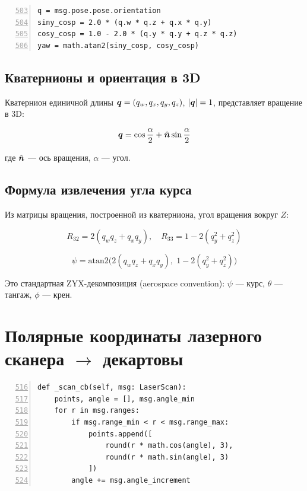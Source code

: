 \begin{filebox}[title={\filepath{dashboard\_node.py}, строки 503--506 --- \_odom\_cb()}]
\begin{lstlisting}[style=pythonstyle, numbers=left, firstnumber=503]
q = msg.pose.pose.orientation
siny_cosp = 2.0 * (q.w * q.z + q.x * q.y)
cosy_cosp = 1.0 - 2.0 * (q.y * q.y + q.z * q.z)
yaw = math.atan2(siny_cosp, cosy_cosp)
\end{lstlisting}
\end{filebox}

\subsection{Кватернионы и ориентация в 3D}

Кватернион единичной длины $\bm{q} = (q_w, q_x, q_y, q_z)$, $|\bm{q}|=1$,
представляет вращение в 3D:

\begin{equation}
  \bm{q} = \cos\frac{\alpha}{2} + \hat{\bm{n}}\sin\frac{\alpha}{2}
  \label{eq:quaternion_def}
\end{equation}

где $\hat{\bm{n}}$ --- ось вращения, $\alpha$ --- угол.

\subsection{Формула извлечения угла курса}

Из матрицы вращения, построенной из кватерниона, угол вращения вокруг $Z$:

\begin{equation}
  R_{32} = 2(q_w q_z + q_x q_y), \quad
  R_{33} = 1 - 2(q_y^2 + q_z^2)
  \label{eq:rot_matrix_elems}
\end{equation}

\begin{equation}
  \boxed{\psi = \mathrm{atan2}\!\bigl(2(q_w q_z + q_x q_y),\;
    1 - 2(q_y^2 + q_z^2)\bigr)}
  \label{eq:yaw_from_quat}
\end{equation}

Это стандартная ZYX-декомпозиция (aerospace convention):
$\psi$ --- курс, $\theta$ --- тангаж, $\phi$ --- крен.

\section{Полярные координаты лазерного сканера $\to$ декартовы}

\begin{filebox}[title={\filepath{dashboard\_node.py}, строки 516--521 --- \_scan\_cb()}]
\begin{lstlisting}[style=pythonstyle, numbers=left, firstnumber=516]
def _scan_cb(self, msg: LaserScan):
    points, angle = [], msg.angle_min
    for r in msg.ranges:
        if msg.range_min < r < msg.range_max:
            points.append([
                round(r * math.cos(angle), 3),
                round(r * math.sin(angle), 3)
            ])
        angle += msg.angle_increment
\end{lstlisting}
\end{filebox}

